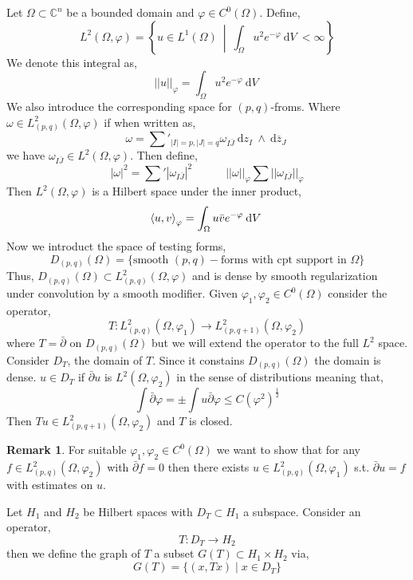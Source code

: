 \documentclass[12pt]{extarticle}
\newcommand{\C}{\mathbb{C}}
\renewcommand{\d}[1]{\: \mathrm{d}#1 \:}
\theoremstyle{definition}
\newtheorem{remark}{Remark}
\newenvironment{definition}[1][Definition:]{\begin{trivlist}
\item[\hskip \labelsep {\bfseries #1}]}{\end{trivlist}}
\begin{document}
Let $\Omega \subset \C^n$ be a bounded domain and $\varphi \in C^0(\Omega)$. Define,
\[ L^2(\Omega, \varphi) = \left\{ u \in L^1(\Omega) \: \middle| \: \int_\Omega u^2 e^{-\varphi} \d{V} < \infty \right\} \]
We denote this integral as,
\[ || u ||_{\varphi} = \int_\Omega u^2 e^{-\varphi} \d{V} \]
We also introduce the corresponding space for $(p,q)$-froms. Where $\omega \in L^2_{(p,q)}(\Omega, \varphi)$ if when written as,
\[ \omega = \sum'_{|I| = p, |J| = q} \omega_{I\bar{J}} \d{z_I} \wedge \d{\overline{z}_J} \]
we have $\omega_{I \bar{J}} \in L^2(\Omega, \varphi)$. Then define,
\[ |\omega|^2 = \sum' |\omega_{I \bar{J}} |^2 \quad \quad \quad || \omega ||_{\varphi} \sum || \omega_{I \bar{J}} ||_{\varphi} \]
Then $L^2(\Omega, \varphi)$ is a Hilbert space under the inner product,
\[ \inner{u}{v}_\varphi = \int_\Omega u \bar{v} e^{-\varphi} \d{V} \]
Now we introduct the space of testing forms,
\[ D_{(p,q)}(\Omega) = \{ \text{smooth } (p,q)-\text{forms with cpt support in } \Omega \} \]
Thus, $D_{(p,q)}(\Omega) \subset L^2_{(p,q)}(\Omega, \varphi)$ and is dense by smooth regularization under convolution by a smooth modifier.  Given $\varphi_1, \varphi_2 \in C^0(\Omega)$ consider the operator,
\[ T : L^2_{(p,q)}(\Omega, \varphi_1) \to L^2_{(p,q+1)}(\Omega, \varphi_2) \]
where $T = \bar{\partial}$ on $D_{(p,q)}(\Omega)$ but we will extend the operator to the full $L^2$ space. Consider $D_T$, the domain of $T$. Since it constains $D_{(p,q)}(\Omega)$ the domain is dense. $u \in D_T$ if $\bar{\partial} u$ is $L^2(\Omega, \varphi_2)$ in the sense of distributions meaning that,
\[ \int \bar{\partial} \varphi = \pm \int u \bar{\partial} \varphi \le C \left( \varphi^2 \right)^{\frac{1}{2}} \]
Then $T u \in L^2_{(p, q+1)}(\Omega, \varphi_2)$ and $T$ is closed.
\bigskip\\
\begin{remark}
For suitable $\varphi_1, \varphi_2 \in C^0(\Omega)$ we want to show that for any $f \in L^2_{(p,q)}(\Omega, \varphi_2)$ with $\bar{\partial} f= 0 $ then there exists $u \in L^2_{(p,q)}(\Omega, \varphi_1)$ s.t. $\bar{\partial} u = f$ with estimates on $u$.
\end{remark} 

\begin{definition}
Let $H_1$ and $H_2$ be Hilbert spaces with $D_T \subset H_1$ a subspace. Consider an operator,
\[ T : D_T \to H_2 \] 
then we define the graph of $T$ a subset $G(T) \subset H_1 \times H_2$ via,
\[ G(T) = \{ (x, Tx) \mid x \in D_T \} \] 
\end{definition}
\end{document}
